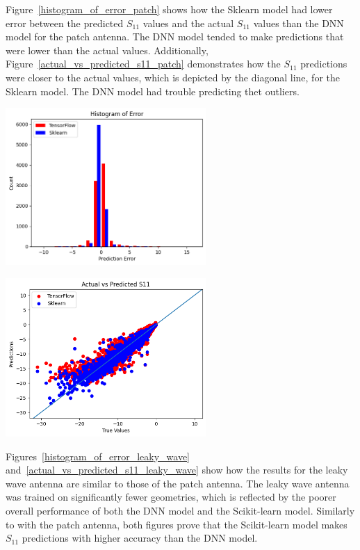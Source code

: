\documentclass[lettersize,journal]{IEEEtran}
\newenvironment{Figure}
    {\par\medskip\noindent\minipage{\linewidth}}
    {\endminipage\par\medskip}
\begin{document}
Figure~\ref{histogram_of_error_patch} shows how the Sklearn model had lower error between the predicted $S_{11}$ values and the actual $S_{11}$ values than the DNN model for the patch antenna. The DNN model tended to make predictions that were lower than the actual values. Additionally, Figure~\ref{actual_vs_predicted_s11_patch} demonstrates how the $S_{11}$ predictions were closer to the actual values, which is depicted by the diagonal line, for the Sklearn model. The DNN model had trouble predicting thet outliers. 

\begin{Figure}
    \centering
    \includegraphics[width=3in]{histogram_patch}
    \label{histogram_of_error_patch}
\end{Figure}

\begin{Figure}
    \centering
    \includegraphics[width=3in]{actual_vs_predicted_s11_patch}
    \label{actual_vs_predicted_s11_patch}
\end{Figure}

Figures~\ref{histogram_of_error_leaky_wave} and~\ref{actual_vs_predicted_s11_leaky_wave} show how the results for the leaky wave antenna are similar to those of the patch antenna. The leaky wave antenna was trained on significantly fewer geometries, which is reflected by the poorer overall performance of both the DNN model and the Scikit-learn model. Similarly to with the patch antenna, both figures prove that the Scikit-learn model makes $S_{11}$ predictions with higher accuracy than the DNN model.
\end{document}

